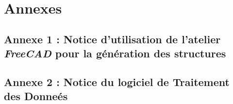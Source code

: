 \documentclass[a4paper]{article}
\begin{document}
	\newpage
	
	\section{Annexes}
	\subsection{Annexe 1 : Notice d'utilisation de l'atelier \textit{FreeCAD} pour la génération des structures}
	\label{doc_lattybrides}
	\newpage	
	
	
	\subsection{Annexe 2 : Notice du logiciel de Traitement des Donneés}
	\label{annexe2}
	\newpage
	
\end{document}
